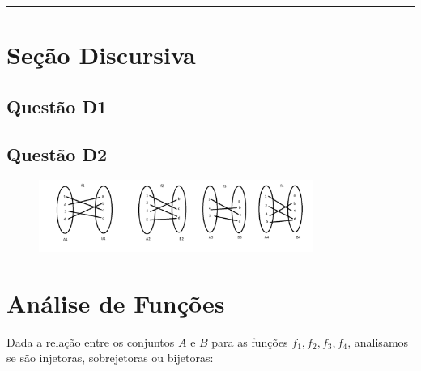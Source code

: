 \documentclass{article}
\begin{document}
\vspace{0.5em}
\hrule
\vspace{0.5em}

\section{Seção Discursiva}

\subsection{Questão D1}
\subsection{Questão D2}
\begin{figure}[h]
    \centering
    \includegraphics[width=0.8\textwidth]{qd2.png} 
    \label{fig:questaoD2}
\end{figure}
\section*{Análise de Funções}

Dada a relação entre os conjuntos \(A\) e \(B\) para as funções \(f_1, f_2, f_3, f_4\), analisamos se são injetoras, sobrejetoras ou bijetoras:
\end{document}
